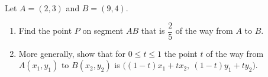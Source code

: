 Let $A=(2,3)$ and $B=(9,4)$.
\begin{enumerate}
\item[(a)] Find the point $P$ on segment $AB$ that is $\dfrac{2}{5}$ of the way from $A$ to $B$.
\item[(b)] More generally, show that for $0\le t\le1$ the point $t$ of the way from $A(x_1,y_1)$ to $B(x_2,y_2)$ is $\bigl((1-t)x_1+tx_2,\ (1-t)y_1+ty_2\bigr)$.
\end{enumerate}
